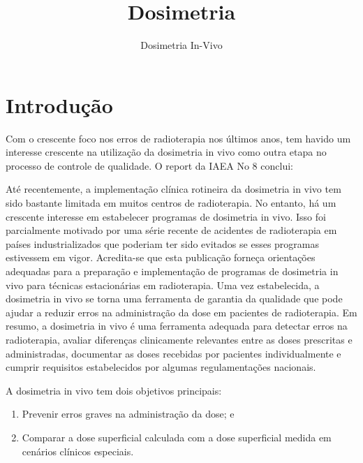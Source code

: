 \documentclass[11pt,a4paper]{article}
\title{\LobsterTwo\Huge{Dosimetria}}
\author{\LobsterTwo\Large{Dosimetria In-Vivo}\nocite{*}}
\date{\LobsterTwo{Dalila Mendonça}}
\newcounter{exemplo}
\begin{document}
	\maketitle

\section{Introdução}

	Com o crescente foco nos erros de radioterapia nos últimos anos, tem havido um interesse crescente na utilização da dosimetria in vivo como outra etapa no processo de controle de qualidade. O report da IAEA No 8 conclui:

  	\begin{exemplo}
		Até recentemente, a implementação clínica rotineira da dosimetria in vivo tem sido bastante limitada em muitos centros de radioterapia. No entanto, há um crescente interesse em estabelecer programas de dosimetria in vivo. Isso foi parcialmente motivado por uma série recente de acidentes de radioterapia em países industrializados que poderiam ter sido evitados se esses programas estivessem em vigor. Acredita-se que esta publicação forneça orientações adequadas para a preparação e implementação de programas de dosimetria in vivo para técnicas estacionárias em radioterapia. Uma vez estabelecida, a dosimetria in vivo se torna uma ferramenta de garantia da qualidade que pode ajudar a reduzir erros na administração da dose em pacientes de radioterapia. Em resumo, a dosimetria in vivo é uma ferramenta adequada para detectar erros na radioterapia, avaliar diferenças clinicamente relevantes entre as doses prescritas e administradas, documentar as doses recebidas por pacientes individualmente e cumprir requisitos estabelecidos por algumas regulamentações nacionais.
	\end{exemplo}
		
	A dosimetria in vivo tem dois objetivos principais:
	
	\begin{enumerate}
		\item Prevenir erros graves na administração da dose; e
		\item Comparar a dose superficial calculada com a dose superficial medida em cenários clínicos especiais.
	\end{enumerate}
\end{document}
